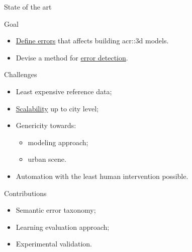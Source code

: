 \documentclass[12pt]{beamer}
\begin{document}
            \begin{frame}{State of the art}
                \centering
                
            \end{frame}

            \begin{frame}{Goal}
                \begin{itemize}[label=\(\blacktriangleright\), font=\color{IGNGreen}]
                    \item<1-> \underline{Define errors} that affects building \gls{acr::3d} models.
                    \item<2-> Devise a method for \underline{error detection}.
                \end{itemize}
            \end{frame}

            \begin{frame}{Challenges}
                \begin{itemize}[label=\(\blacktriangleright\), font=\color{IGNGreen}]
                    \item<1-> Least expensive reference data;
                    \item<2-> \underline{Scalability} up to city level;
                    \item<3-> Genericity towards:
                        \begin{itemize}
                            \item<4-> modeling approach;
                            \item<5-> urban scene.
                        \end{itemize}
                    \item<6-> Automation with the least human intervention possible.
                \end{itemize}
            \end{frame}

            \begin{frame}{Contributions}
                \begin{itemize}[label=\(\blacktriangleright\), font=\color{IGNGreen}, itemsep=2em]
                    \item<1-> Semantic error taxonomy;
                    \item<2-> Learning evaluation approach;
                    \item<3-> Experimental validation.
                \end{itemize}
            \end{frame}
\end{document}
